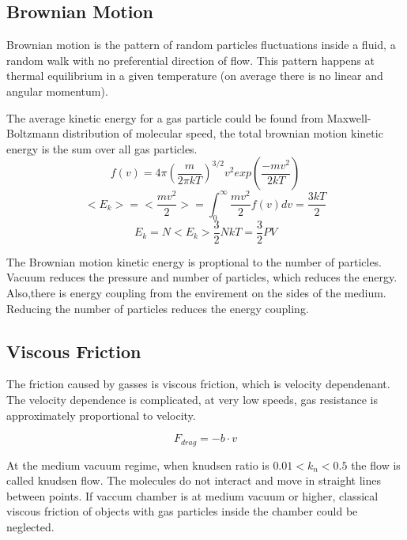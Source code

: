 \documentclass[\main/master.tex]{subfiles}
\begin{document}
\subsection{Brownian Motion}
Brownian motion is the pattern of random particles fluctuations inside a fluid, a random walk with no preferential direction of flow. This pattern happens at thermal equilibrium in a given temperature (on average there is no linear and angular momentum). 
\par
The average kinetic energy for a gas particle could be found from Maxwell-Boltzmann distribution of molecular speed, the total brownian motion kinetic energy is the sum over all gas particles.
\begin{equation}
f(v) = 4\pi(\frac{m}{2\pi kT})^{3/2}v^2exp(\frac{-mv^2}{2kT})     \label{eqn:Maxwell_Boltzmann}
\end{equation}  
\begin{equation}
<E_k>=<\frac{mv^2}{2}> = \int_{0}^{\infty}\frac{mv^2}{2}f(v)dv =  \frac{3kT}{2}    \label{eqn:avrage_kinetic}
\end{equation}
\begin{equation}
E_k=N<E_k> \frac{3}{2}NkT = \frac{3}{2}PV    \label{eqn:total_kinetic}
\end{equation}

The Brownian motion kinetic energy is proptional to the number of particles. Vacuum reduces the pressure and number of particles, which reduces the energy. Also,there is energy coupling from the envirement on the sides of the medium. Reducing the number of particles reduces the energy coupling.

\subsection{Viscous Friction}
The friction caused by gasses is viscous friction, which is velocity dependenant. The velocity dependence is complicated, at very low speeds, gas resistance is approximately proportional to velocity. 

\begin{equation}
F_{drag} = -b\cdot v  \label{eqn:energy-mass-equivalence-relation}
\end{equation}

At the medium vacuum regime, when knudsen ratio is $0.01<k_n<0.5$ the flow is called knudsen flow. The molecules do not interact and move in straight lines between points. If vaccum chamber is at medium vacuum or higher, classical viscous friction of objects with gas particles inside the chamber could be neglected.
\end{document}
